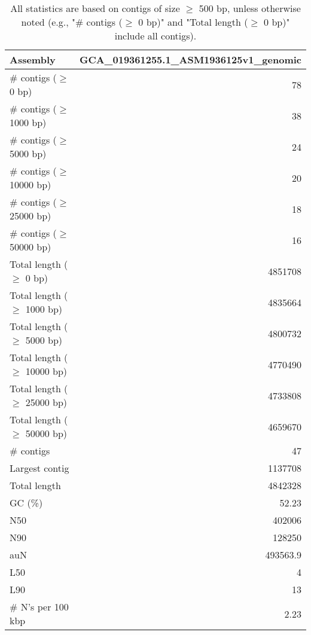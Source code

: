 \documentclass[12pt,a4paper]{article}
\begin{document}
\begin{table}[ht]
\begin{center}
\caption{All statistics are based on contigs of size $\geq$ 500 bp, unless otherwise noted (e.g., "\# contigs ($\geq$ 0 bp)" and "Total length ($\geq$ 0 bp)" include all contigs).}
\begin{tabular}{|l*{1}{|r}|}
\hline
Assembly & GCA\_019361255.1\_ASM1936125v1\_genomic \\ \hline
\# contigs ($\geq$ 0 bp) & 78 \\ \hline
\# contigs ($\geq$ 1000 bp) & 38 \\ \hline
\# contigs ($\geq$ 5000 bp) & 24 \\ \hline
\# contigs ($\geq$ 10000 bp) & 20 \\ \hline
\# contigs ($\geq$ 25000 bp) & 18 \\ \hline
\# contigs ($\geq$ 50000 bp) & 16 \\ \hline
Total length ($\geq$ 0 bp) & 4851708 \\ \hline
Total length ($\geq$ 1000 bp) & 4835664 \\ \hline
Total length ($\geq$ 5000 bp) & 4800732 \\ \hline
Total length ($\geq$ 10000 bp) & 4770490 \\ \hline
Total length ($\geq$ 25000 bp) & 4733808 \\ \hline
Total length ($\geq$ 50000 bp) & 4659670 \\ \hline
\# contigs & 47 \\ \hline
Largest contig & 1137708 \\ \hline
Total length & 4842328 \\ \hline
GC (\%) & 52.23 \\ \hline
N50 & 402006 \\ \hline
N90 & 128250 \\ \hline
auN & 493563.9 \\ \hline
L50 & 4 \\ \hline
L90 & 13 \\ \hline
\# N's per 100 kbp & 2.23 \\ \hline
\end{tabular}
\end{center}
\end{table}
\end{document}
